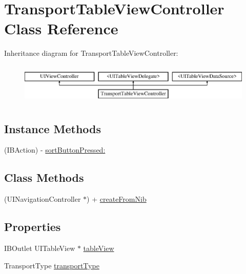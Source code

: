\hypertarget{interface_transport_table_view_controller}{}\section{Transport\+Table\+View\+Controller Class Reference}
\label{interface_transport_table_view_controller}
Inheritance diagram for Transport\+Table\+View\+Controller\+:\begin{figure}[H]
\begin{center}
\leavevmode
\includegraphics[height=1.975309cm]{interface_transport_table_view_controller}
\end{center}
\end{figure}
\subsection*{Instance Methods}
\begin{DoxyCompactItemize}
\item 
(I\+B\+Action) -\/ \hyperlink{interface_transport_table_view_controller_a73427941afd3f5313a888f666678255c}{sort\+Button\+Pressed\+:}
\end{DoxyCompactItemize}
\subsection*{Class Methods}
\begin{DoxyCompactItemize}
\item 
(U\+I\+Navigation\+Controller $\ast$) + \hyperlink{interface_transport_table_view_controller_a9d077e63ddb1f5ee89e70442d2ab540b}{create\+From\+Nib}
\end{DoxyCompactItemize}
\subsection*{Properties}
\begin{DoxyCompactItemize}
\item 
I\+B\+Outlet U\+I\+Table\+View $\ast$ \hyperlink{interface_transport_table_view_controller_a1785d3e6d819f19e324774d783e4019f}{table\+View}
\item 
Transport\+Type \hyperlink{interface_transport_table_view_controller_a30bd421cf096f28dff64432e92b0008e}{transport\+Type}
\end{DoxyCompactItemize}


